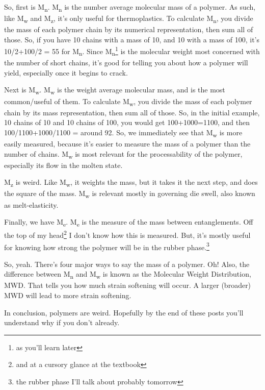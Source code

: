 \documentclass[12pt]{article}[titlepage]
\newcommand{\1}{\={a}}
\newcommand{\2}{\={e}}
\newcommand{\3}{\={\i}}
\newcommand{\4}{\=o}
\newcommand{\5}{\=u}
\newcommand{\6}{\={A}}
\newcommand{\sub}[1]{\textsubscript{#1}}
\renewcommand{\,}{\textsuperscript{,}}
\begin{document}
So, first is M\sub{n}.
M\sub{n} is the number average molecular mass of a polymer.
As such, like M\sub{w} and M\sub{z}, it's only useful for thermoplastics.
To calculate M\sub{n}, you divide the mass of each polymer chain by its numerical representation, then sum all of those.
So, if you have 10 chains with a mass of 10, and 10 with a mass of 100, it's 10/2+100/2 = 55 for M\sub{n}.
Since M\sub{n}\footnote{as you'll learn later} is the molecular weight most concerned with the number of short chains, it's good for telling you about how a polymer will yield, especially once it begins to crack.

Next is M\sub{w}.
M\sub{w} is the weight average molecular mass, and is the most common/useful of them.
To calculate M\sub{w}, you divide the mass of each polymer chain by its mass representation, then sum all of those.
So, in the initial example, 10 chains of 10 and 10 chains of 100, you would get 100+1000=1100, and then 100/1100+1000/1100 = around 92.
So, we immediately see that M\sub{w} is more easily measured, because it's easier to measure the mass of a polymer than the number of chains.
M\sub{w} is most relevant for the processability of the polymer, especially its flow in the molten state.

M\sub{z} is weird.
Like M\sub{w}, it weights the mass, but it takes it the next step, and does the square of the mass.
M\sub{w} is relevant mostly in governing die swell, also known as melt-elasticity.

Finally, we have M\sub{e}.
M\sub{e} is the measure of the mass between entanglements.
Off the top of my head\footnote{and at a cursory glance at the textbook} I don't know how this is measured.
But, it's mostly useful for knowing how strong the polymer will be in the rubber phase.\footnote{the rubber phase I'll talk about probably tomorrow}

So, yeah.
There's four major ways to say the mass of a polymer.
Oh! 
Also, the difference between M\sub{n} and M\sub{w} is known as the Molecular Weight Distribution, MWD.
That tells you how much strain softening will occur.
A larger (broader) MWD will lead to more strain softening.

In conclusion, polymers are weird.
Hopefully by the end of these posts you'll understand why if you don't already.
\end{document}
